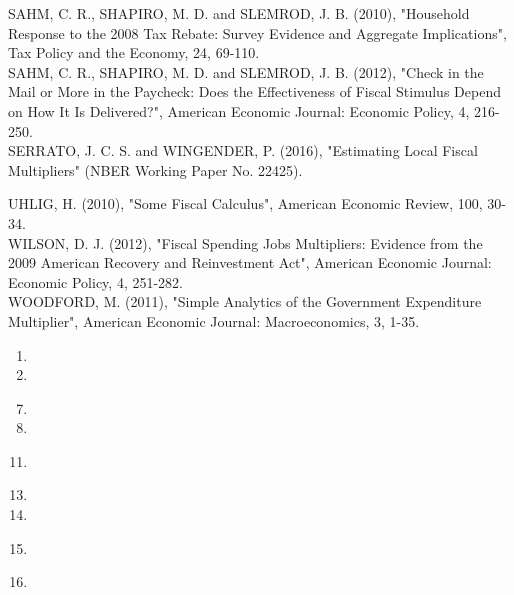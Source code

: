 \documentclass[10pt]{article}
\begin{document}
SAHM, C. R., SHAPIRO, M. D. and SLEMROD, J. B. (2010), "Household Response to the 2008 Tax Rebate: Survey Evidence and Aggregate Implications", Tax Policy and the Economy, 24, 69-110.\\
SAHM, C. R., SHAPIRO, M. D. and SLEMROD, J. B. (2012), "Check in the Mail or More in the Paycheck: Does the Effectiveness of Fiscal Stimulus Depend on How It Is Delivered?", American Economic Journal: Economic Policy, 4, 216-250.\\
SERRATO, J. C. S. and WINGENDER, P. (2016), "Estimating Local Fiscal Multipliers" (NBER Working Paper No. 22425).

UHLIG, H. (2010), "Some Fiscal Calculus", American Economic Review, 100, 30-34.\\
WILSON, D. J. (2012), "Fiscal Spending Jobs Multipliers: Evidence from the 2009 American Recovery and Reinvestment Act", American Economic Journal: Economic Policy, 4, 251-282.\\
WOODFORD, M. (2011), "Simple Analytics of the Government Expenditure Multiplier", American Economic Journal: Macroeconomics, 3, 1-35.

\begin{enumerate}
  \item 
  \item 
\end{enumerate}

\begin{enumerate}
  \setcounter{enumi}{6}
  \item 
  \item 
\end{enumerate}

\begin{enumerate}
  \setcounter{enumi}{10}
  \item 
\end{enumerate}

\begin{enumerate}
  \setcounter{enumi}{12}
  \item 
  \item 
\end{enumerate}

\begin{enumerate}
  \setcounter{enumi}{14}
  \item 
\end{enumerate}

\begin{enumerate}
  \setcounter{enumi}{15}
  \item 
\end{enumerate}
\end{document}
